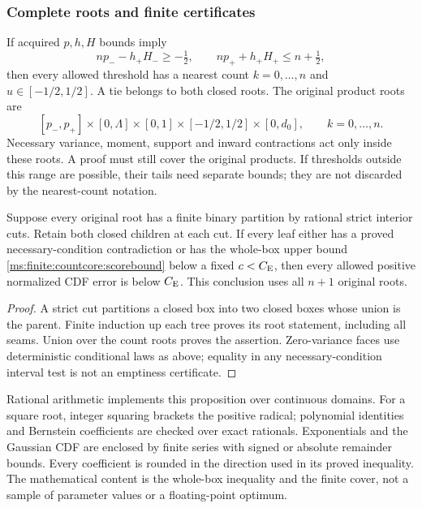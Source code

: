\subsubsection{Complete roots and finite certificates}

If acquired \(p,h,H\) bounds imply
\[
 np_- -h_+H_-\ge-\tfrac12,\qquad
 np_+ +h_+H_+\le n+\tfrac12,
\]
then every allowed threshold has a nearest count \(k=0,\ldots,n\)
and \(u\in[-1/2,1/2]\). A tie belongs to both closed roots.
The original product roots are
\[
 [p_-,p_+]\times[0,\Lambda]\times[0,1]
                  \times[-1/2,1/2]\times[0,d_0],
 \qquad k=0,\ldots,n.
\]
Necessary variance, moment, support and inward contractions act only
inside these roots. A proof must still cover the original products.
If thresholds outside this range are possible, their tails need separate
bounds; they are not discarded by the nearest-count notation.

\begin{proposition}
\label{ms:finite:countcore:forest}
Suppose every original root has a finite binary partition by rational
strict interior cuts. Retain both closed children at each cut. If every
leaf either has a proved necessary-condition contradiction or has the
whole-box upper bound \eqref{ms:finite:countcore:scorebound} below a fixed
\(c<C_{\mathrm E}\), then every allowed positive normalized CDF error is below
\(C_{\mathrm E}\). This conclusion uses all \(n+1\) original roots.
\end{proposition}
\begin{proof}
A strict cut partitions a closed box into two closed boxes whose union
is the parent. Finite induction up each tree proves its root statement,
including all seams. Union over the count roots proves the assertion.
Zero-variance faces use deterministic conditional laws as above; equality
in any necessary-condition interval test is not an emptiness certificate.
\end{proof}

Rational arithmetic implements this proposition over continuous domains.
For a square root, integer squaring brackets the positive radical;
polynomial identities and Bernstein coefficients are checked over exact
rationals. Exponentials and the Gaussian CDF are enclosed by finite series
with signed or absolute remainder bounds. Every coefficient is rounded in
the direction used in its proved inequality. The mathematical content is
the whole-box inequality and the finite cover, not a sample of parameter
values or a floating-point optimum.

